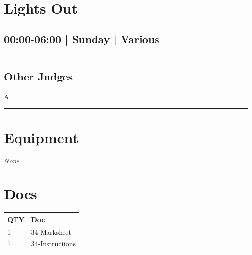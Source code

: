 \documentclass[10pt, A5]{article}
\begin{document}
        \begin{framed}
        \begin{minipage}{\textwidth}

        \setcounter{section}{53}
        \section{Lights Out}
        \subsection*{00:00-06:00 | Sunday | Various}

        \vspace{0.25cm}
        \hrule
        \vspace{0.25cm}


        \subsection*{Other Judges}
                    All

            \vspace{0.25cm}
        \hrule
        \vspace{0.25cm}

        \begin{multicols}{2}

		\section*{\faWrench \: Equipment}

				\textit{None}
		
		\vfill\null
		\columnbreak

			\section*{\faFile \: Docs}
		 	\begin{center}
			\begin{tabular}{p{2cm}p{4cm}}

			\textbf{QTY} & \textbf{Doc} \\\toprule
										1&34-Marksheet\\\midrule
										1&34-Instructions\\\midrule
							\end{tabular}
			\end{center}
	

		\vfill\null

		\end{multicols}
\end{minipage}
\end{framed}
\end{document}
